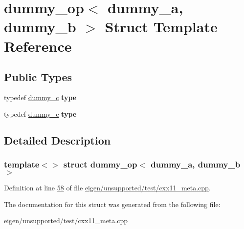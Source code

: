 \hypertarget{structdummy__op_3_01dummy__a_00_01dummy__b_01_4}{}\section{dummy\+\_\+op$<$ dummy\+\_\+a, dummy\+\_\+b $>$ Struct Template Reference}
\label{structdummy__op_3_01dummy__a_00_01dummy__b_01_4}
\subsection*{Public Types}
\begin{DoxyCompactItemize}
\item 
\mbox{\label{structdummy__op_3_01dummy__a_00_01dummy__b_01_4_a9040f8ef96f83dcd747fd8676ab11c8c}} 
typedef \hyperlink{structdummy__c}{dummy\+\_\+c} {\bfseries type}
\item 
\mbox{\label{structdummy__op_3_01dummy__a_00_01dummy__b_01_4_a9040f8ef96f83dcd747fd8676ab11c8c}} 
typedef \hyperlink{structdummy__c}{dummy\+\_\+c} {\bfseries type}
\end{DoxyCompactItemize}


\subsection{Detailed Description}
\subsubsection*{template$<$$>$\newline
struct dummy\+\_\+op$<$ dummy\+\_\+a, dummy\+\_\+b $>$}



Definition at line \hyperlink{eigen_2unsupported_2test_2cxx11__meta_8cpp_source_l00058}{58} of file \hyperlink{eigen_2unsupported_2test_2cxx11__meta_8cpp_source}{eigen/unsupported/test/cxx11\+\_\+meta.\+cpp}.



The documentation for this struct was generated from the following file\+:\begin{DoxyCompactItemize}
\item 
eigen/unsupported/test/cxx11\+\_\+meta.\+cpp\end{DoxyCompactItemize}
